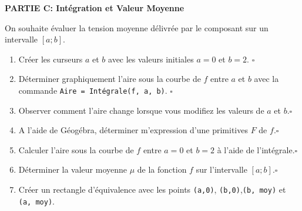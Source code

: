 \documentclass[a4paper,10pt]{report}
\begin{document}
\textbf{PARTIE C: Intégration et Valeur Moyenne}

\medskip


On souhaite évaluer la tension moyenne délivrée par le composant sur un intervalle $[a ; b]$.


\begin{enumerate}
    \item Créer les curseurs $a$ et $b$ avec les valeurs initiales $a=0$ et $b=2$. \hfill $\square$
    \item Déterminer graphiquement l'aire sous la courbe de $f$ entre $a$ et $b$ avec la commande \verb|Aire = Intégrale(f, a, b)|. \hfill $\square$
        
    \item Observer comment l'aire change lorsque vous modifiez les valeurs de $a$ et $b$.\hfill $\square$

    \item A l'aide de Géogébra, déterminer m'expression d'une primitives $F$ de $f$.\hfill $\square$

    \item Calculer l'aire sous la courbe de $f$ entre $a=0$ et $b=2$ à l'aide de l'intégrale.\hfill $\square$
    \item Déterminer la valeur moyenne $\mu$ de la fonction $f$ sur l'intervalle $[a ; b]$.\hfill $\square$
    \item Créer un rectangle d'équivalence avec les points \verb|(a,0)|, \verb|(b,0)|,\verb|(b, moy)| et \verb|(a, moy)|. 
    

\end{enumerate}
\end{document}
